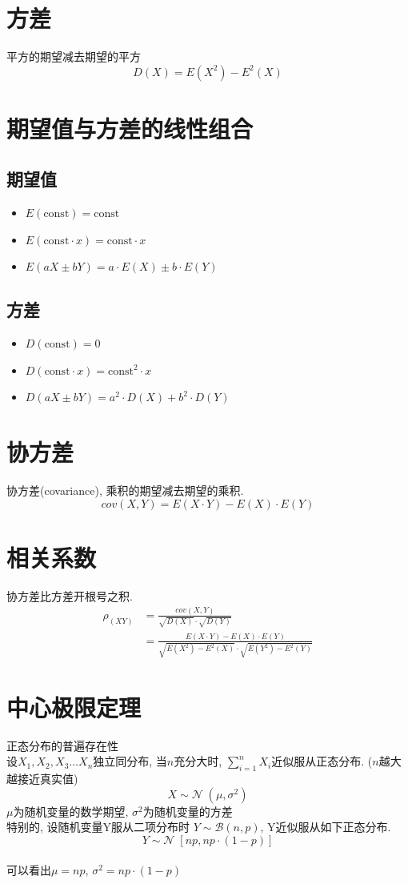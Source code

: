 \documentclass[a4paper]{report}
\begin{document}
\section{方差}
平方的期望减去期望的平方
$$D(X)=E(X^2)-E^2(X)$$
\section{期望值与方差的线性组合}
\subsection{期望值}
\begin{itemize}
  \item $E(\text{const})=\text{const}$
  \item $E(\text{const}\cdot x)=\text{const}\cdot x$
  \item $E(aX\pm bY)=a\cdot E(X)\pm b\cdot E(Y)$
\end{itemize}
\subsection{方差}
\begin{itemize}
  \item $D(\text{const})=0$
  \item $D(\text{const}\cdot x)=\text{const}^2\cdot x$
  \item $D(aX\pm bY)=a^2\cdot D(X)+ b^2\cdot D(Y)$
\end{itemize}
\section{协方差}
协方差(covariance), 乘积的期望减去期望的乘积. 
$$cov(X,Y)=E(X\cdot Y)-E(X)\cdot E(Y)$$
\section{相关系数}
协方差比方差开根号之积. 
\begin{align*}
  \rho_(XY)&=\frac{cov(X,Y)}{\sqrt{D(X)}\cdot\sqrt{D(Y)}}\\
  &=\frac{E(X\cdot Y)-E(X)\cdot E(Y)}{\sqrt{E(X^2)-E^2(X)}\cdot \sqrt{E(Y^2)-E^2(Y)}}
\end{align*}
\section{中心极限定理}
正态分布的普遍存在性\\
设$X_1,X_2,X_3\dots X_n$独立同分布, 当$n$充分大时, $\sum_{i=1}^n X_i$近似服从正态分布. ($n$越大越接近真实值)
$$X\sim \mathcal{N}\;(\mu,\sigma^2)$$
$\mu$为随机变量的数学期望, $\sigma^2$为随机变量的方差\\
特别的, 设随机变量Y服从二项分布时 $Y\sim \mathcal{B}(n,p)$, Y近似服从如下正态分布. 
$$Y\sim \mathcal{N}\;[np,np\cdot(1-p)]$$
\\可以看出$\mu=np$, $\sigma^2=np\cdot (1-p)$
\end{document}
